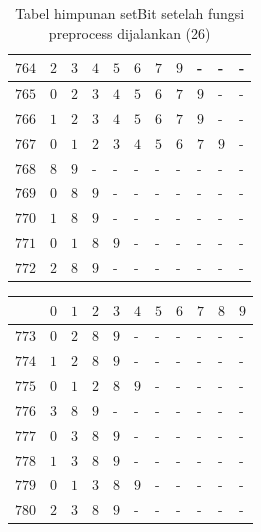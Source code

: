 \begin{appendices}
\begin{table}[H]
\begin{tabular} {|l|l|l|l|l|l|l|l|l|l|l|}
  		$ 764 $ & $ 2 $ &$ 3 $ &$ 4 $ &$ 5 $ &$ 6 $ &$ 7 $ &$ 9 $ & - &  - &  -   \\ \hline
  		$ 765 $ & $ 0 $ &$ 2 $ &$ 3 $ &$ 4 $ &$ 5 $ &$ 6 $ &$ 7 $ &$ 9 $ & - &  -   \\ \hline
  		$ 766 $ & $ 1 $ &$ 2 $ &$ 3 $ &$ 4 $ &$ 5 $ &$ 6 $ &$ 7 $ &$ 9 $ & - &  -   \\ \hline
  		$ 767 $ & $ 0 $ &$ 1 $ &$ 2 $ &$ 3 $ &$ 4 $ &$ 5 $ &$ 6 $ &$ 7 $ &$ 9 $ & -   \\ \hline
  		$ 768 $ & $ 8 $ &$ 9 $ & - &  - &  - &  - &  - &  - &  - &  -   \\ \hline
  		$ 769 $ & $ 0 $ &$ 8 $ &$ 9 $ & - &  - &  - &  - &  - &  - &  -   \\ \hline
  		$ 770 $ & $ 1 $ &$ 8 $ &$ 9 $ & - &  - &  - &  - &  - &  - &  -   \\ \hline
  		$ 771 $ & $ 0 $ &$ 1 $ &$ 8 $ &$ 9 $ & - &  - &  - &  - &  - &  -   \\ \hline
  		$ 772 $ & $ 2 $ &$ 8 $ &$ 9 $ & - &  - &  - &  - &  - &  - &  -   \\ \hline
  	\end{tabular}\caption{Tabel himpunan setBit setelah fungsi preprocess dijalankan (26)}
  	\label{tab:setbit_26}
  \end{table}
  \begin{table}[H]
  	\centering
  	\begin{tabular} {|l|l|l|l|l|l|l|l|l|l|l|} \hline
  		\backslashbox{$Num$}{$index$} & $ 0 $ & $ 1 $ & $ 2 $ & $ 3 $ & $ 4 $ & $ 5 $ & $ 6 $ & $ 7 $ & $ 8 $ & $ 9 $ \\ \hline
  		$ 773 $ & $ 0 $ &$ 2 $ &$ 8 $ &$ 9 $ & - &  - &  - &  - &  - &  -   \\ \hline
  		$ 774 $ & $ 1 $ &$ 2 $ &$ 8 $ &$ 9 $ & - &  - &  - &  - &  - &  -   \\ \hline
  		$ 775 $ & $ 0 $ &$ 1 $ &$ 2 $ &$ 8 $ &$ 9 $ & - &  - &  - &  - &  -   \\ \hline
  		$ 776 $ & $ 3 $ &$ 8 $ &$ 9 $ & - &  - &  - &  - &  - &  - &  -   \\ \hline
  		$ 777 $ & $ 0 $ &$ 3 $ &$ 8 $ &$ 9 $ & - &  - &  - &  - &  - &  -   \\ \hline
  		$ 778 $ & $ 1 $ &$ 3 $ &$ 8 $ &$ 9 $ & - &  - &  - &  - &  - &  -   \\ \hline
  		$ 779 $ & $ 0 $ &$ 1 $ &$ 3 $ &$ 8 $ &$ 9 $ & - &  - &  - &  - &  -   \\ \hline
  		$ 780 $ & $ 2 $ &$ 3 $ &$ 8 $ &$ 9 $ & - &  - &  - &  - &  - &  -   \\ \hline

\end{tabular}
\end{table}
\end{appendices}

